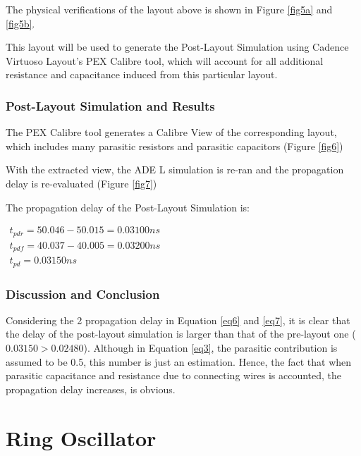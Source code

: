 \documentclass[letterpaper, 11pt]{article}
\begin{document}
The physical verifications of the layout above is shown in Figure \ref{fig5a} and \ref{fig5b}.


This layout will be used to generate the Post-Layout Simulation using Cadence Virtuoso Layout's PEX Calibre tool, which will account for all additional resistance and capacitance induced from this particular layout.


\section{Post-Layout Simulation and Results}
\label{sec:post_layout_simulation_results}

The PEX Calibre tool generates a Calibre View of the corresponding layout, which includes many parasitic resistors and parasitic capacitors (Figure \ref{fig6})


With the extracted view, the ADE L simulation is re-ran and the propagation delay is re-evaluated (Figure \ref{fig7})


The propagation delay of the Post-Layout Simulation is:

\begin{math}\label{eq7}
\begin{array}{l}
t_{pdr} = 50.046 - 50.015 = 0.03100ns\\
t_{pdf} = 40.037 - 40.005 = 0.03200ns\\
t_{pd} = 0.03150ns
\end{array}
\end{math}

\section{Discussion and Conclusion}
\label{sec:disc_and_concl}

Considering the 2 propagation delay in Equation \ref{eq6} and \ref{eq7}, it is clear that the delay of the post-layout simulation is larger than that of the pre-layout one ($0.03150 > 0.02480$). Although in Equation \ref{eq3}, the parasitic contribution is assumed to be 0.5, this number is just an estimation. Hence, the fact that when parasitic capacitance and resistance due to connecting wires is accounted, the propagation delay increases, is obvious. 


\part{Ring Oscillator}
\label{part2}
\end{document}
